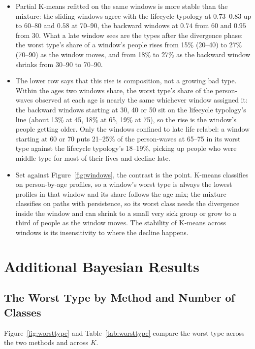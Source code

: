 \documentclass[11pt]{article}
\begin{document}
	\begin{itemize}
		\item Partial K-means refitted on the same windows is more stable than the mixture: the sliding windows agree with the lifecycle typology at $0.73$--$0.83$ up to 60--80 and $0.58$ at 70--90, the backward windows at $0.74$ from 60 and $0.95$ from 30. What a late window sees are the types after the divergence phase: the worst type's share of a window's people rises from 15\% (20--40) to 27\% (70--90) as the window moves, and from 18\% to 27\% as the backward window shrinks from 30--90 to 70--90.
		\item The lower row says that this rise is composition, not a growing bad type. Within the ages two windows share, the worst type's share of the person-waves observed at each age is nearly the same whichever window assigned it: the backward windows starting at 30, 40 or 50 sit on the lifecycle typology's line (about 13\% at 45, 18\% at 65, 19\% at 75), so the rise is the window's people getting older. Only the windows confined to late life relabel: a window starting at 60 or 70 puts 21--25\% of the person-waves at 65--75 in its worst type against the lifecycle typology's 18--19\%, picking up people who were middle type for most of their lives and decline late.
		\item Set against Figure~\ref{fig:windows}, the contrast is the point. K-means classifies on person-by-age profiles, so a window's worst type is always the lowest profiles in that window and its share follows the age mix; the mixture classifies on paths with persistence, so its worst class needs the divergence inside the window and can shrink to a small very sick group or grow to a third of people as the window moves. The stability of K-means across windows is its insensitivity to where the decline happens.
	\end{itemize}


	\section{Additional Bayesian Results} \label{app:bayesian}

	\subsection{The Worst Type by Method and Number of Classes}
	\label{app:worsttype}

	Figure~\ref{fig:worsttype} and Table~\ref{tab:worsttype} compare the worst type across the two methods and across $K$.
\end{document}
